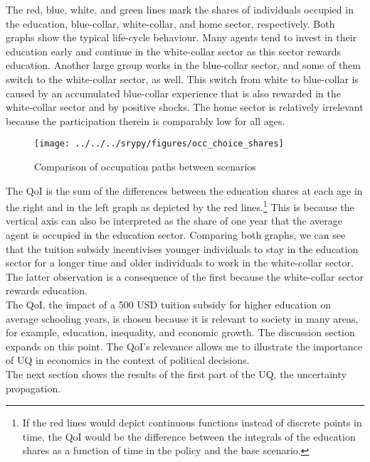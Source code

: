 \documentclass[a4paper,12pt]{article}
\begin{document}
The red, blue, white, and green lines mark the shares of individuals occupied in the education, blue-collar, white-collar, and home sector, respectively. Both graphs show the typical life-cycle behaviour. Many agents tend to invest in their education early and continue in the white-collar sector as this sector rewards education. Another large group works in the blue-collar sector, and some of them switch to the white-collar sector, as well. This switch from white to blue-collar is caused by an accumulated blue-collar experience that is also rewarded in the white-collar sector and by positive shocks. The home sector is relatively irrelevant because the participation therein is comparably low for all ages.
\begin{figure}[H]
	\caption{Comparison of occupation paths between scenarios}
	\centering
	\texttt{[image: ../../../srypy/figures/occ\_choice\_shares]}
	\label{fig:paths}
\end{figure}
\noindent
The QoI is the sum of the differences between the education shares at each age in the right and in the left graph as depicted by the red lines.\footnote{If the red lines would depict continuous functions instead of discrete points in time, the QoI would be the difference between the integrals of the education shares as a function of time in the policy and the base scenario.} This is because the vertical axis can also be interpreted as the share of one year that the average agent is occupied in the education sector. Comparing both graphs, we can see that the tuition subsidy incentivises younger individuals to stay in the education sector for a longer time and older individuals to work in the white-collar sector. The latter observation is a consequence of the first because the white-collar sector rewards education.\\
\newline
The QoI, the impact of a 500 USD tuition subsidy for higher education on average schooling years, is chosen because it is relevant to society in many areas, for example, education, inequality, and economic growth. The discussion section expands on this point. The QoI's relevance allows me to illustrate the importance of UQ in economics in the context of political decisions.\\
\newline
The next section shows the results of the first part of the UQ, the uncertainty propagation.
\end{document}
